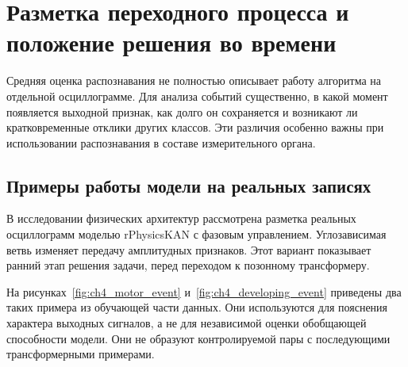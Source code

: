 \section{Разметка переходного процесса и положение решения во времени}
\label{sec:ch4_event_examples}


Средняя оценка распознавания не полностью описывает работу
алгоритма на отдельной осциллограмме. Для анализа событий
существенно, в какой момент появляется выходной признак,
как долго он сохраняется и возникают ли кратковременные
отклики других классов. Эти различия особенно важны
при использовании распознавания в составе измерительного органа.

\subsection{Примеры работы модели на реальных записях}
\label{sec:ch4_real_event_examples}


В исследовании физических архитектур рассмотрена разметка
реальных осциллограмм моделью rPhysicsKAN с фазовым управлением.
Углозависимая ветвь изменяет передачу амплитудных признаков.
Этот вариант показывает ранний этап
решения задачи, перед переходом к позонному трансформеру.

{}
На рисунках~\ref{fig:ch4_motor_event}
и~\ref{fig:ch4_developing_event} приведены два таких примера
из обучающей части данных. Они используются для пояснения
характера выходных сигналов, а не для независимой оценки
обобщающей способности модели.
Они не образуют контролируемой пары с последующими
трансформерными примерами.

{}

